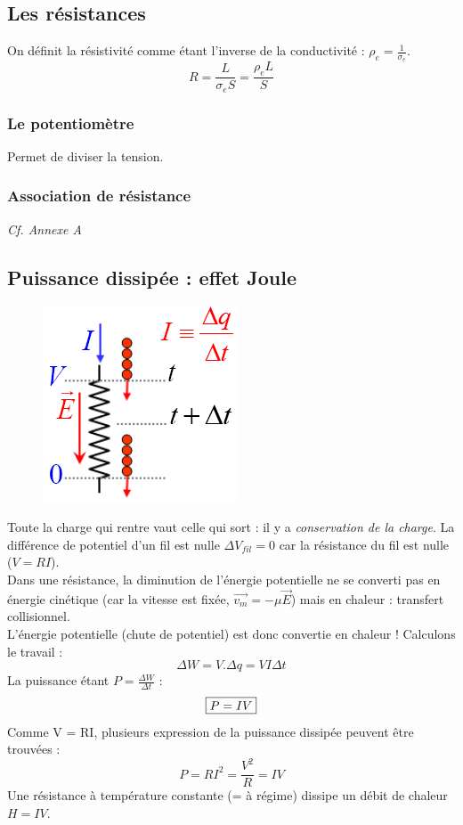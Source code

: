 \documentclass	[11pt, a4paper, openany]{book}
\begin{document}
\subsection{Les résistances}
On définit la résistivité comme étant l'inverse de la conductivité : $\rho_e = \frac{1}{\sigma_e}$.
\begin{equation}
R = \frac{L}{\sigma_e S} = \frac{\rho_e L}{S}
\end{equation}

\subsubsection{Le potentiomètre}
Permet de diviser la tension.

\subsubsection{Association de résistance}
\textit{Cf. Annexe A}

\subsection{Puissance dissipée : effet Joule}
\begin{figure}
\includegraphics[scale=0.44]{es/image18.png}
\end{figure}
Toute la charge qui rentre vaut celle qui sort : il y a \textit{conservation de la charge}. La différence de potentiel d'un fil est nulle $\Delta V_{fil} = 0$ car la résistance du fil est nulle ($V = RI$).\\

Dans une résistance, la diminution de l'énergie potentielle ne se converti pas en énergie cinétique (car la vitesse est fixée, $\vec{v_m} = -\mu \vec{E}$) mais en chaleur : transfert collisionnel.\\
L'énergie potentielle (chute de potentiel) est donc convertie en chaleur ! Calculons le travail :
\begin{equation}
\Delta W = V.\Delta q = VI \Delta t
\end{equation}
La puissance étant $P = \frac{\Delta W}{\Delta t}$ :
\begin{equation}
\fbox{$P = IV$}
\end{equation}
Comme V = RI, plusieurs expression de la puissance dissipée peuvent être trouvées :
\begin{equation}
P = RI^2 = \frac{V^2}{R} = IV
\end{equation}
Une résistance à température constante (= à régime) dissipe un débit de chaleur $H = IV$.
\end{document}
